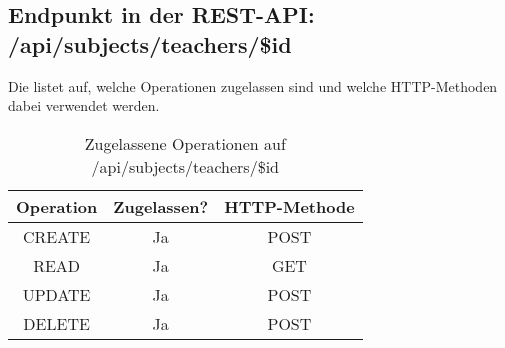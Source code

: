 \subsection{Endpunkt in der REST-API: /api/subjects/teachers/\$id}
Die  listet auf, welche Operationen zugelassen sind und welche HTTP-Methoden dabei verwendet werden. 

\begin{table}[!htbp]
	\begin{tabular}{|c|c|c|}
		\hline
			\textbf{Operation} & \textbf{Zugelassen?} & \textbf{HTTP-Methode} \\ \hline
			CREATE & Ja & POST \\ \hline 
			READ & Ja & GET \\ \hline
			UPDATE & Ja & POST \\ \hline 
			DELETE & Ja & POST \\ \hline
	\end{tabular}

		\caption{Zugelassene Operationen auf /api/subjects/teachers/\$id}
		\label{tab:end:rest:api:subjects:teachers:id:meth}
\end{table}
